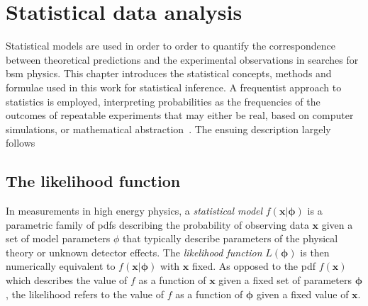 

\chapter{Statistical data analysis}\label{ch:statistics}

\ifpdf
    \graphicspath{{chapter-statistics/Figs/Raster/}{chapter-statistics/Figs/PDF/}{chapter-statistics/Figs/}}
\else
    \graphicspath{{chapter-statistics/Figs/Vector/}{chapter-statistics/Figs/}}
\fi


Statistical models are used in order to order to quantify the correspondence between theoretical predictions and the experimental observations in searches for \gls{bsm} physics. This chapter introduces the statistical concepts, methods and formulae used in this work for statistical inference. A frequentist approach to statistics is employed, interpreting probabilities as the frequencies of the outcomes of repeatable experiments that may either be real, based on computer simulations, or mathematical abstraction~\cite{pdg2020,Cranmer:2015nia}. The ensuing description largely follows~\cite{Cranmer:2015nia, Cowan:2010js}

\section{The likelihood function}
 
In measurements in high energy physics, a \textit{statistical model} $f(\boldsymbol{x}\vert\boldsymbol{\phi})$ is a parametric family of \glspl{pdf} describing the probability of observing data $\boldsymbol{x}$ given a set of model parameters $\phi$ that typically describe parameters of the physical theory or unknown detector effects. The \textit{likelihood function} $L(\boldsymbol{\phi})$ is then numerically equivalent to $f(\boldsymbol{x}\vert\boldsymbol{\phi})$ with $\boldsymbol{x}$ fixed. As opposed to the \gls{pdf} $f(\boldsymbol{x})$ which describes the value of $f$ as a function of $\boldsymbol{x}$ given a fixed set of parameters $\boldsymbol{\phi}$, the likelihood refers to the value of $f$ as a function of $\boldsymbol{\phi}$ given a fixed value of $\boldsymbol{x}$.


